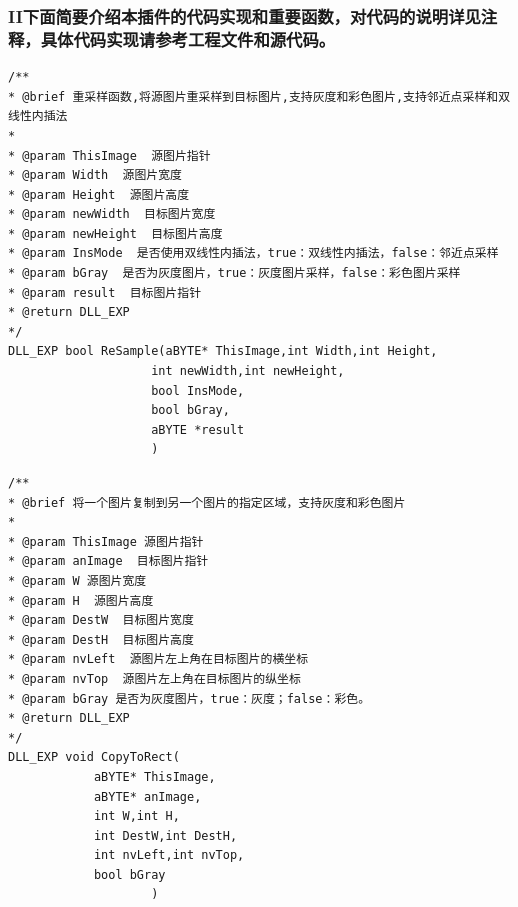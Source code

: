 \documentclass[12pt,hyperref,a4paper,UTF8]{ctexart}
\begin{document}
        \subsubsection*{II下面简要介绍本插件的代码实现和重要函数，对代码的说明详见注释，具体代码实现请参考工程文件和源代码。}


        \begin{lstlisting}[caption={重采样函数}, label={lst:example}]
/**
* @brief 重采样函数,将源图片重采样到目标图片,支持灰度和彩色图片,支持邻近点采样和双线性内插法
* 
* @param ThisImage  源图片指针
* @param Width  源图片宽度
* @param Height  源图片高度
* @param newWidth  目标图片宽度
* @param newHeight  目标图片高度
* @param InsMode  是否使用双线性内插法，true：双线性内插法，false：邻近点采样
* @param bGray  是否为灰度图片，true：灰度图片采样，false：彩色图片采样
* @param result  目标图片指针
* @return DLL_EXP 
*/
DLL_EXP bool ReSample(aBYTE* ThisImage,int Width,int Height,
                    int newWidth,int newHeight,
                    bool InsMode,
                    bool bGray,
                    aBYTE *result
                    )
        \end{lstlisting}



        \begin{lstlisting}[caption={图片复制函数}, label={lst:example}]
/**
* @brief 将一个图片复制到另一个图片的指定区域，支持灰度和彩色图片
* 
* @param ThisImage 源图片指针
* @param anImage  目标图片指针
* @param W 源图片宽度
* @param H  源图片高度
* @param DestW  目标图片宽度
* @param DestH  目标图片高度
* @param nvLeft  源图片左上角在目标图片的横坐标
* @param nvTop  源图片左上角在目标图片的纵坐标
* @param bGray 是否为灰度图片，true：灰度；false：彩色。
* @return DLL_EXP 
*/
DLL_EXP void CopyToRect(
            aBYTE* ThisImage,
            aBYTE* anImage,
            int W,int H,
            int DestW,int DestH,
            int nvLeft,int nvTop,
            bool bGray
                    )
        \end{lstlisting}
\end{document}

